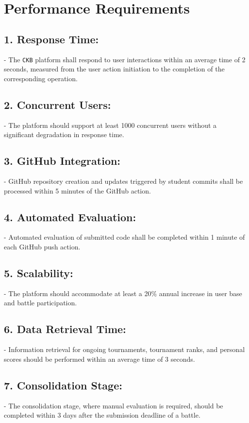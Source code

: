 \section{Performance Requirements}
\label{subsec:performance_requirements}%

\subsection*{1. Response Time:}
   - The \verb|CKB| platform shall respond to user interactions within an average time of 2 seconds, measured from the user action initiation to the completion of the corresponding operation.

\subsection*{2. Concurrent Users:}
   - The platform should support at least 1000 concurrent users without a significant degradation in response time.

\subsection*{3. GitHub Integration:}
   - GitHub repository creation and updates triggered by student commits shall be processed within 5 minutes of the GitHub action.

\subsection*{4. Automated Evaluation:}
   - Automated evaluation of submitted code shall be completed within 1 minute of each GitHub push action.

\subsection*{5. Scalability:}
   - The platform should accommodate at least a 20\% annual increase in user base and battle participation.

\subsection*{6. Data Retrieval Time:}
   - Information retrieval for ongoing tournaments, tournament ranks, and personal scores should be performed within an average time of 3 seconds.

\subsection*{7. Consolidation Stage:}
   - The consolidation stage, where manual evaluation is required, should be completed within 3 days after the submission deadline of a battle.

